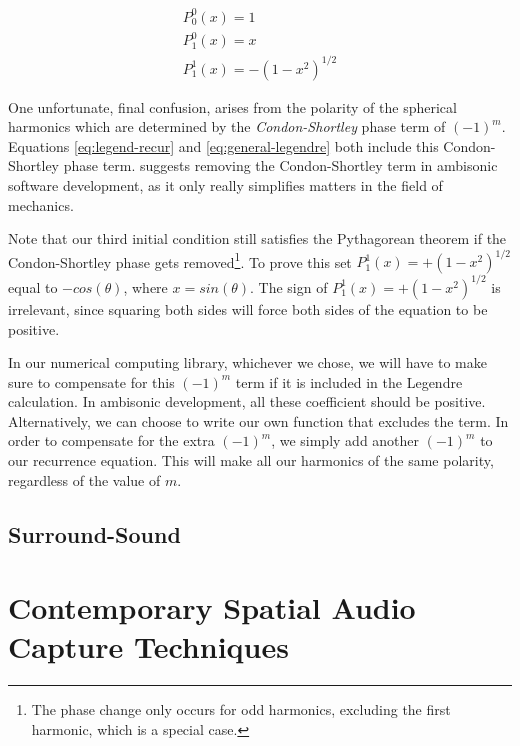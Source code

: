 \begin{equation}
\begin{array}{l}
P_{0}^{0}(x)=1 \\
P_{1}^{0}(x)=x \\
P_{1}^{1}(x)=-\left(1-x^{2}\right)^{1 / 2}
\end{array}
\label{eq:general-legendre}
\end{equation}

One unfortunate, final confusion, arises from the polarity of the spherical harmonics which are determined by the \textit{Condon-Shortley} phase term of $(-1)^m$. Equations \ref{eq:legend-recur} and \ref{eq:general-legendre} both include this Condon-Shortley phase term. \cite{nachbar2011ambix} suggests removing the Condon-Shortley term in ambisonic software development, as it only really simplifies matters in the field of mechanics.

Note that our third initial condition still satisfies the Pythagorean theorem if the Condon-Shortley phase gets removed\footnote{The phase change only occurs for odd harmonics, excluding the first harmonic, which is a special case.}. To prove this set $P_{1}^{1}(x)=+\left(1-x^{2}\right)^{1 / 2}$ equal to $-cos(\theta)$, where $x = sin(\theta)$. The sign of $P_{1}^{1}(x)=+\left(1-x^{2}\right)^{1 / 2}$ is irrelevant, since squaring both sides will force both sides of the equation to be positive. 

In our numerical computing library, whichever we chose, we will have to make sure to compensate for this $(-1)^m$ term if it is included in the Legendre calculation. In ambisonic development, all these coefficient should be positive. Alternatively, we can choose to write our own function that excludes the term. In order to compensate for the extra $(-1)^m$, we simply add another $(-1)^m$ to our recurrence equation. This will make all our harmonics of the same polarity, regardless of the value of $m$.

\subsection{Surround-Sound}


\section{Contemporary Spatial Audio Capture Techniques} \label{sec:contemp_audio_capture}

